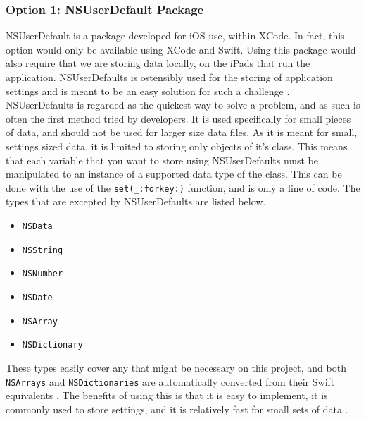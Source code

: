 \documentclass[onecolumn, draftclsnofoot,10pt, compsoc]{IEEEtran}
\begin{document}
\subsubsection{Option 1: NSUserDefault Package}
NSUserDefault is a package developed for iOS use, within XCode.
In fact, this option would only be available using XCode and Swift.
Using this package would also require that we are storing data locally, on the iPads that run the application.
NSUserDefaults is ostensibly used for the storing of application settings and is meant to be an easy solution for such a challenge \cite{udefaultApple}.
NSUserDefaults is regarded as the quickest way to solve a problem, and as such is often the first method tried by developers.
It is used specifically for small pieces of data, and should not be used for larger size data files.
As it is meant for small, settings sized data, it is limited to storing only objects of it's class.
This means that each variable that you want to store using NSUserDefaults must be manipulated to an instance of a supported data type of the class.
This can be done with the use of the {\lstinline|set(_:forkey:)|} function, and is only a line of code.
The types that are excepted by NSUserDefaults are listed below.
\begin{itemize}
\item \lstinline|NSData|
\item \lstinline|NSString|
\item \lstinline|NSNumber|
\item \lstinline|NSDate|
\item \lstinline|NSArray|
\item \lstinline|NSDictionary|
\end{itemize}
These types easily cover any that might be necessary on this project, and both \lstinline|NSArrays| and \lstinline|NSDictionaries| are automatically converted from their Swift equivalents \cite{udefaultBlog}.
The benefits of using this is that it is easy to implement, it is commonly used to store settings, and it is relatively fast for small sets of data \cite{storeoptions}.
\end{document}
